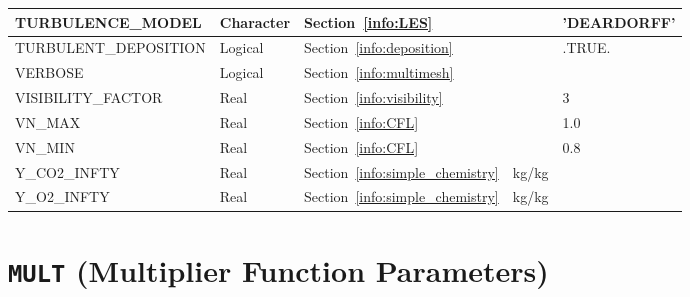 \documentclass[11pt]{book}
\begin{document}
\begin{longtable}{@{\extracolsep{\fill}}|l|l|l|l|l|}
{\ct TURBULENCE\_MODEL}                         & Character     & Section~\ref{info:LES}                                &               & {\ct 'DEARDORFF'} \\ \hline
{\ct TURBULENT\_DEPOSITION}                     & Logical       & Section~\ref{info:deposition}                         &               & {\ct .TRUE.}      \\ \hline
{\ct VERBOSE}                                   & Logical       & Section~\ref{info:multimesh}                          &               &                   \\ \hline
{\ct VISIBILITY\_FACTOR}                        & Real          & Section~\ref{info:visibility}                         &               & 3                 \\ \hline
{\ct VN\_MAX}                                   & Real          & Section~\ref{info:CFL}                                &               & 1.0               \\ \hline
{\ct VN\_MIN}                                   & Real          & Section~\ref{info:CFL}                                &               & 0.8               \\ \hline
{\ct Y\_CO2\_INFTY}                             & Real          & Section~\ref{info:simple_chemistry}                   &  kg/kg        &                   \\ \hline
{\ct Y\_O2\_INFTY}                              & Real          & Section~\ref{info:simple_chemistry}                   &  kg/kg        &                   \\ \hline
\end{longtable}


\vspace{\baselineskip}


\section{\texorpdfstring{{\tt MULT}}{MULT} (Multiplier Function Parameters)}
\end{document}

